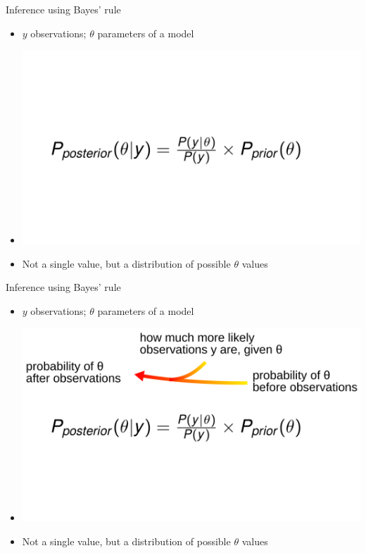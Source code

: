 \documentclass[10pt]{beamer}
\begin{document}
\begin{frame}{Inference using Bayes' rule}
  \begin{itemize}
  \item $y$ observations; $\theta$ parameters of a model
\item[] \includegraphics[width=.9\textwidth]{bayes-1.png}
    \item Not a single value, but a distribution of possible $\theta$ values
  \end{itemize}
\end{frame}
\begin{frame}{Inference using Bayes' rule}
  \begin{itemize}
  \item $y$ observations; $\theta$ parameters of a model
\item[] \includegraphics[width=.9\textwidth]{bayes-2.png}
    \item Not a single value, but a distribution of possible $\theta$ values
  \end{itemize}
\end{frame}
\end{document}

